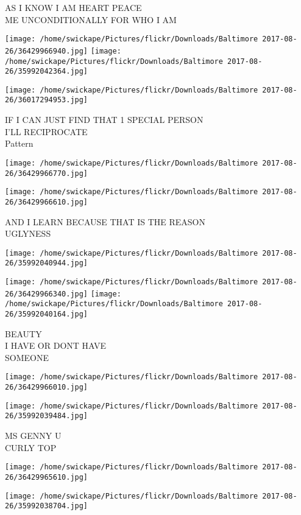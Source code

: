 \documentclass[10pt,letterpaper]{article}
\begin{document}
AS I KNOW I AM HEART PEACE\\
ME UNCONDITIONALLY FOR WHO I AM
\pagebreak

\texttt{[image: /home/swickape/Pictures/flickr/Downloads/Baltimore 2017-08-26/36429966940.jpg]}
\texttt{[image: /home/swickape/Pictures/flickr/Downloads/Baltimore 2017-08-26/35992042364.jpg]}

\texttt{[image: /home/swickape/Pictures/flickr/Downloads/Baltimore 2017-08-26/36017294953.jpg]}

IF I CAN JUST FIND THAT 1 SPECIAL PERSON\\
I'LL RECIPROCATE\\
Pattern
\pagebreak

\texttt{[image: /home/swickape/Pictures/flickr/Downloads/Baltimore 2017-08-26/36429966770.jpg]}

\vspace{0.25in}
\texttt{[image: /home/swickape/Pictures/flickr/Downloads/Baltimore 2017-08-26/36429966610.jpg]}

AND I LEARN BECAUSE THAT IS THE REASON\\
UGLYNESS
\pagebreak

\texttt{[image: /home/swickape/Pictures/flickr/Downloads/Baltimore 2017-08-26/35992040944.jpg]}

\vspace{0.25in}
\texttt{[image: /home/swickape/Pictures/flickr/Downloads/Baltimore 2017-08-26/36429966340.jpg]}
\texttt{[image: /home/swickape/Pictures/flickr/Downloads/Baltimore 2017-08-26/35992040164.jpg]}

BEAUTY\\
I HAVE OR DONT HAVE\\
SOMEONE
\pagebreak

\texttt{[image: /home/swickape/Pictures/flickr/Downloads/Baltimore 2017-08-26/36429966010.jpg]}

\vspace{0.25in}
\texttt{[image: /home/swickape/Pictures/flickr/Downloads/Baltimore 2017-08-26/35992039484.jpg]}

MS GENNY U\\
CURLY TOP
\pagebreak

\texttt{[image: /home/swickape/Pictures/flickr/Downloads/Baltimore 2017-08-26/36429965610.jpg]}

\vspace{0.25in}
\texttt{[image: /home/swickape/Pictures/flickr/Downloads/Baltimore 2017-08-26/35992038704.jpg]}
\end{document}
